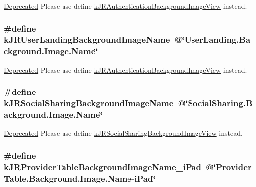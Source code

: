 \label{group__custom_interface_ga893fb6e20be0c6658e81a6a5d5c121f0}
\begin{Desc}
\item[\hyperlink{deprecated__deprecated000006}{Deprecated}]Please use define \hyperlink{group__custom_interface_ga68a4950b1b3834ce60218856f596059f}{kJRAuthenticationBackgroundImageView} instead. \end{Desc}
\hypertarget{group__custom_interface_gadda3f945ba5012762eb92764b251b918}{
\subsubsection[{kJRUserLandingBackgroundImageName}]{\setlength{\rightskip}{0pt plus 5cm}\#define kJRUserLandingBackgroundImageName~@\char`\"{}UserLanding.Background.Image.Name\char`\"{}}}
\label{group__custom_interface_gadda3f945ba5012762eb92764b251b918}
\begin{Desc}
\item[\hyperlink{deprecated__deprecated000007}{Deprecated}]Please use define \hyperlink{group__custom_interface_ga68a4950b1b3834ce60218856f596059f}{kJRAuthenticationBackgroundImageView} instead. \end{Desc}
\hypertarget{group__custom_interface_gad2e00942af19ec9478ba58a491a8b8f2}{
\subsubsection[{kJRSocialSharingBackgroundImageName}]{\setlength{\rightskip}{0pt plus 5cm}\#define kJRSocialSharingBackgroundImageName~@\char`\"{}SocialSharing.Background.Image.Name\char`\"{}}}
\label{group__custom_interface_gad2e00942af19ec9478ba58a491a8b8f2}
\begin{Desc}
\item[\hyperlink{deprecated__deprecated000008}{Deprecated}]Please use define \hyperlink{group__custom_interface_gafe08832d1e15427e1bc1c8c1e3a4c641}{kJRSocialSharingBackgroundImageView} instead. \end{Desc}
\hypertarget{group__custom_interface_ga25b26cff96d8f174f3bdc040031466b7}{
\subsubsection[{kJRProviderTableBackgroundImageName\_\-iPad}]{\setlength{\rightskip}{0pt plus 5cm}\#define kJRProviderTableBackgroundImageName\_\-iPad~@\char`\"{}ProviderTable.Background.Image.Name-\/iPad\char`\"{}}}
